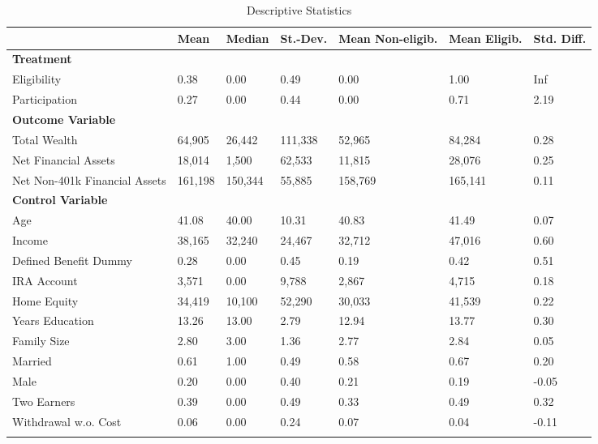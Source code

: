 \documentclass[10pt,a4paper]{article}
\begin{document}
\begin{singlespace}
\begin{ThreePartTable}
				\begin{longtable}{l C{1.45cm} C{1.45cm} C{1.45cm} C{1.45cm}C{1.45cm} C{1.45cm}}
					\caption{Descriptive Statistics}\label{tab_descriptives}\\
					\toprule
					 & Mean & Median & St.-Dev. & Mean Non-eligib. & Mean Eligib. & Std. Diff.\\ 
					\midrule
					\textbf{Treatment} & & & & & & \\
					Eligibility & 0.38 & 0.00 & 0.49 & 0.00 & 1.00 & Inf \\ 
  Participation & 0.27 & 0.00 & 0.44 & 0.00 & 0.71 & 2.19 \\ 
  					\midrule
					\textbf{Outcome Variable} & & & & & & \\
					 Total Wealth & 64,905 & 26,442 & 111,338 & 52,965 & 84,284 & 0.28 \\ 
  Net Financial Assets & 18,014 & 1,500 & 62,533 & 11,815 & 28,076 & 0.25 \\ 
  Net Non-401k Financial Assets & 161,198 & 150,344 & 55,885 & 158,769 & 165,141 & 0.11 \\ 
					\midrule
					\textbf{Control Variable}  & & & & & & \\
     Age & 41.08 & 40.00 & 10.31 & 40.83 & 41.49 & 0.07 \\ 
  Income & 38,165 & 32,240 & 24,467 & 32,712 & 47,016 & 0.60 \\ 
  Defined Benefit Dummy & 0.28 & 0.00 & 0.45 & 0.19 & 0.42 & 0.51 \\ 
  IRA Account & 3,571 & 0.00 & 9,788 & 2,867 & 4,715 & 0.18 \\ 
  Home Equity & 34,419 & 10,100 & 52,290 & 30,033 & 41,539 & 0.22 \\ 
  Years Education & 13.26 & 13.00 & 2.79 & 12.94 & 13.77 & 0.30 \\ 
  Family Size & 2.80 & 3.00 & 1.36 & 2.77 & 2.84 & 0.05 \\ 
  Married & 0.61 & 1.00 & 0.49 & 0.58 & 0.67 & 0.20 \\ 
  Male & 0.20 & 0.00 & 0.40 & 0.21 & 0.19 & -0.05 \\ 
  Two Earners & 0.39 & 0.00 & 0.49 & 0.33 & 0.49 & 0.32 \\ 
  Withdrawal w.o. Cost & 0.06 & 0.00 & 0.24 & 0.07 & 0.04 & -0.11 \\ 
				\bottomrule
				\insertTableNotes \\
				\end{longtable} 
				
			\end{ThreePartTable}
\end{singlespace} 
\end{document}

